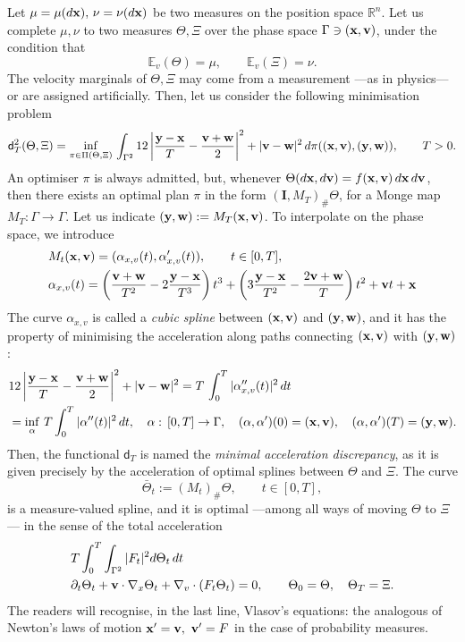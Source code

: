 \documentclass{article}
\newcommand{\bv}{\mathrm{BV}}
\renewcommand{\to}{\rightarrow}
\def \Id{\mathbf{I}}
\def\bx{{\bf x}}
\def\by{{\bf y}}
\def\bv{{\bf v}}
\def\bw{{\bf w}}
\begin{document}
Let $\mu=\mu(d\bx),\,\nu=\nu(d\bx)$ be two measures on the position space $\mathbb R^n$. Let us complete $\mu,\nu$ to two measures $\Theta, \Xi$ over the phase space $\Gamma \ni (\bx,\bv)$, under the condition that 
\[
\mathbb E_v(\Theta) = \mu, \qquad \mathbb E_v(\Xi) =\nu.
\]
The velocity marginals of $\Theta, \Xi$ may come from a measurement ---as in physics--- or are assigned artificially.\cite{Chen}
Then, let us consider the following minimisation problem
\[
\mathsf d_T^2(\Theta,\Xi) = \inf_{\pi \in \Pi(\Theta,\Xi)} \, {\int_{\Gamma^2} 12 }\left| \frac{\by-\bx}{T} - \frac{\bv+\bw}{2} \right|^2 + |\bv-\bw|^2 \, d\pi((\bx,\bv),(\by,\bw)), \qquad T>0.
\]
An optimiser $\pi$ is always admitted, but, whenever $\Theta(d\bx,d\bv) = f(\bx,\bv) \, d\bx \,d\bv$, then there exists an optimal plan $\pi$ in the form $(\Id,M_T)_\# \Theta$, for a Monge map $M_T: \Gamma \to \Gamma$. Let us indicate $(\by,\bw) := M_T(\bx,\bv)$. To interpolate on the phase space, we introduce 
\[
\begin{aligned}
&M_t(\bx,\bv) = (\alpha_{x,v}(t),\alpha'_{x,v}(t)), \qquad t \in [0,T], \\
&\alpha_{x,v}(t) = \left( \frac{\bv+\bw}{T^2}-2\frac{\by-\bx}{T^3} \right)t^3 + \left(3\frac{\by-\bx}{T^2}-\frac{2\bv+\bw}{T}\right)t^2 + \bv t+\bx
\end{aligned}
\]
The curve $\alpha_{x,v}$ is called a \emph{cubic spline} between $(\bx,\bv)$ and $(\by,\bw)$, and it has the property of minimising the acceleration along paths connecting $(\bx,\bv)$ with $(\by,\bw)$: 
\[
\begin{aligned}
&12 \left| \frac{\by-\bx}{T} - \frac{\bv+\bw}{2} \right|^2 +|\bv-\bw|^2 = T \,\int_0^T |\alpha''_{x,v}(t)|^2 \, dt \\
&= \inf_{\alpha} \, T \int_0^T |\alpha''(t)|^2 \, dt, \quad \alpha: \, [0,T] \to \Gamma, \quad (\alpha,\alpha')(0) = (\bx,\bv), \quad (\alpha,\alpha')(T) = (\by,\bw).
\end{aligned}
\]
Then, the functional $\mathsf d_T$ is named the \emph{minimal acceleration discrepancy}\cite{BrigatiOtikin}, as it is given precisely by the acceleration of optimal splines between $\Theta$ and $\Xi$.
The curve 
\[
\bar\Theta_t := (M_t)_\# \Theta, \qquad t \in [0,T],
\]
is a measure-valued spline, and it is optimal ---among all ways of moving $\Theta$ to $\Xi$--- in the sense of the total acceleration
\[
\begin{aligned}
&T\int_0^T \int_{\Gamma^2} |F_t|^2 d\Theta_t \, dt\, \\
&\partial_t \Theta_t + \bv \cdot \nabla_x \Theta_t + \nabla_v \cdot (F_t \Theta_t) = 0, \qquad  \Theta_0= \Theta, \quad  \Theta_T = \Xi. 
\end{aligned}
\]
The readers will recognise, in the last line, Vlasov's equations: the analogous of Newton's laws of motion $\bx'=\bv, \,\, \bv'=F$ in the case of probability measures.
\end{document}

